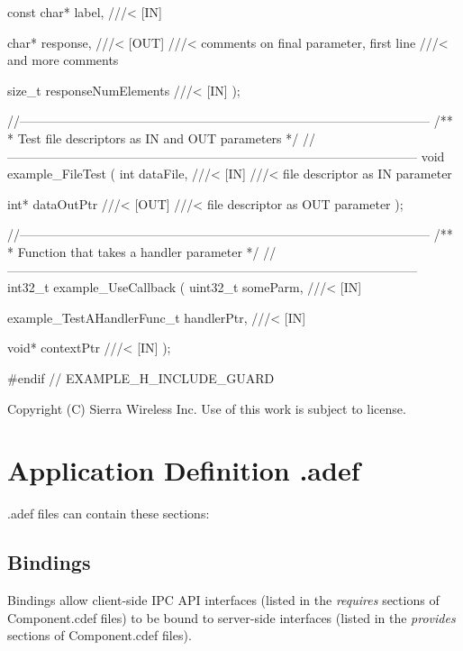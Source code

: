 \begin{DoxyVerbInclude}
    const char* label,
        ///< [IN]

    char* response,
        ///< [OUT]
        ///< comments on final parameter, first line
        ///< and more comments

    size_t responseNumElements
        ///< [IN]
);

//--------------------------------------------------------------------------------------------------
/**
 * Test file descriptors as IN and OUT parameters
 */
//--------------------------------------------------------------------------------------------------
void example_FileTest
(
    int dataFile,
        ///< [IN]
        ///< file descriptor as IN parameter

    int* dataOutPtr
        ///< [OUT]
        ///< file descriptor as OUT parameter
);

//--------------------------------------------------------------------------------------------------
/**
 * Function that takes a handler parameter
 */
//--------------------------------------------------------------------------------------------------
int32_t example_UseCallback
(
    uint32_t someParm,
        ///< [IN]

    example_TestAHandlerFunc_t handlerPtr,
        ///< [IN]

    void* contextPtr
        ///< [IN]
);


#endif // EXAMPLE_H_INCLUDE_GUARD

\end{DoxyVerbInclude}






Copyright (C) Sierra Wireless Inc. Use of this work is subject to license. \hypertarget{defFilesAdef}{}\section{Application Definition .adef}\label{defFilesAdef}
{\ttfamily .adef} files can contain these sections\+:\hypertarget{def_files_adef_defFilesAdef_bindings}{}\subsection{Bindings}\label{def_files_adef_defFilesAdef_bindings}
Bindings allow client-\/side I\+P\+C A\+P\+I interfaces (listed in the {\itshape requires} sections of Component.\+cdef files) to be bound to server-\/side interfaces (listed in the {\itshape provides} sections of Component.\+cdef files).

